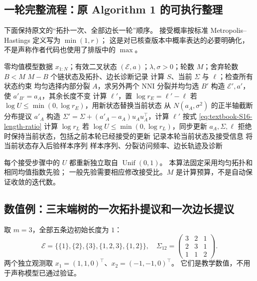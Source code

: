 \documentclass[UTF8,11pt,fontset=fandol,openany,oneside]{ctexbook}
\theoremstyle{definition}
\theoremstyle{remark}
\numberwithin{equation}{chapter}
\begin{document}
\subsection{一轮完整流程：原 Algorithm 1 的可执行整理}

下面保持原文的“拓扑一次、全部边长一轮”顺序。
接受概率按标准 Metropolis--Hastings 定义写为 $\min(1,r)$；
这是对已核查版本中概率表达的必要明确化，不是声称作者代码也使用了排版中的 $\max$。

\begin{algorithm}[htbp]
\caption{S16：树状态上的拓扑与边长交替 MH（原流程的等价整理）}
\label{alg:textbook-S16}
\begin{algorithmic}[1]
\Require 零均值模型数据 $x_{1:N}$；有效二叉状态 $(\mathcal E,a)$；$\lambda,\sigma>0$；轮数 $M$；舍弃轮数 $B<M$
\Ensure $M-B$ 个链状态及拓扑、边长诊断记录
\State 计算 $S$、当前 $\Sigma$ 与 $\ell$；检查所有状态约束
    \State 均匀选择内部分裂 $A$，求另外两个 NNI 分裂并均匀选 $B'$
    \State 构造 $\mathcal E',a'$，使 $a'_{B'}=a_A$，其余长度不变
    \State 计算 $\ell'$，置 $\log r_E=\ell'-\ell$
    \State 若 $\log U\le\min(0,\log r_E)$，用新状态替换当前状态
  \EndIf
    \State 从 $N(a_A,\sigma^2)$ 的正半轴截断分布提议 $a'_A$
    \State 构造 $\Sigma'=\Sigma+(a'_A-a_A)u_Au_A^\top$，计算 $\ell'$
    \State 按式 \eqref{eq:textbook-S16-length-ratio} 计算 $\log r_L$
    \State 若 $\log U\le\min(0,\log r_L)$，同步更新 $a_A,\Sigma,\ell$
    \State 拒绝时保持当前状态，包括之前本轮已经接受的更新
  \EndFor
  \State 记录本轮当前状态及接受信息
    \State 将当前状态存入后验样本序列
  \EndIf
\EndFor
\State \Return 样本序列、分裂访问频率、边长轨迹及诊断
\end{algorithmic}
\end{algorithm}

每个接受步骤中的 $U$ 都重新独立取自 $\operatorname{Unif}(0,1)$。
本算法固定采用均匀拓扑和相同均值指数先验；
一般先验需要相应修改接受比。$M$ 是计算预算，不是自动保证收敛的迭代数。

\subsection{数值例：三末端树的一次拓扑提议和一次边长提议}

取 $m=3$，全部五条边初始长度为 $1$：
\[
 \mathcal E=\{\{1\},\{2\},\{3\},\{1,2,3\},\{1,2\}\},
 \quad
 \Sigma_{12}=
 \begin{pmatrix}3&2&1\\2&3&1\\1&1&2\end{pmatrix}.
\]
两个独立观测取
$x_1=(1,1,0)^\top$、$x_2=(-1,-1,0)^\top$。
它们是教学数值，不用于声称模型已通过验证。
\end{document}
